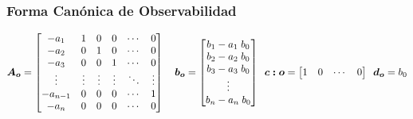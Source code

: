 \subsubsection*{Forma Canónica de Observabilidad}
\begin{equation*}
    \bm{A_o} = 
    \begin{bmatrix}
    -a_1 & 1 & 0 & 0 & \cdots & 0\\
    -a_2 & 0 & 1 & 0 & \cdots & 0\\
    -a_3 & 0 & 0 & 1 & \cdots & 0\\
    \vdots & \vdots & \vdots & \vdots & \ddots & \vdots \\
    -a_{n-1} & 0 & 0 & 0 & \cdots & 1\\
    -a_{n} & 0 & 0 & 0 & \cdots & 0 \\
    \end{bmatrix}
    \hspace*{10pt}
    \bm{b_o} = 
    \begin{bmatrix}
    b_1 - a_1\; b_0 \\
    b_2 - a_2\; b_0 \\
    b_3 - a_3\; b_0 \\
    \vdots \\
    b_n - a_n\; b_0 \\
    \end{bmatrix}
    \hspace*{5pt}
    \bm{c:o} = 
    \begin{bmatrix}
    1 & 0 & \cdots & 0
    \end{bmatrix}
    \hspace*{5pt}
    \bm{d_o} = b_0
\end{equation*}


